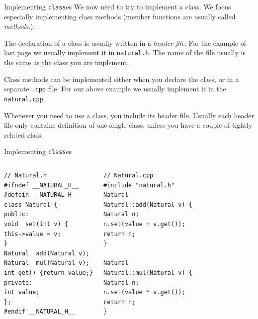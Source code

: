 \begin{frame}{Implementing \texttt{class}es}
We now need to try to implement a class. We focus especially implementing class methods (member functions are usually called \textit{methods}.). 

\vspace{0.1in}
The declaration of a class is usually written in a \textit{header file}. For the example of last page we usually implement it in \texttt{natural.h}. The name of the file usually is the same as the class you are implement.  

\vspace{0.1in}
Class methods can be implemented either when you declare the class, or in a separate \texttt{.cpp} file. For our above example we usually implement it in the \texttt{natural.cpp}.

\vspace{0.1in}
Whenever you need to use a class, you include its header file. Usually each header file only contains definition of one single class, unless you have a couple of tightly related class. 
\end{frame}

\begin{frame}[fragile]{Implementing \texttt{class}es}
\begin{columns}[]

\vspace{-.3in}
\begin{verbatim}
// Natural.h
#ifndef __NATURAL_H__
#defein __NATURAL_H__
class Natural {
public:
void  set(int v) {
this->value = v;
}
Natural  add(Natural v);
Natural  mul(Natural v);
int get() {return value;}
private:
int value;
};
#endif __NATURAL_H__
\end{verbatim}


\vspace{-.3in}

\begin{verbatim}
// Natural.cpp
#include "natural.h"
Natural 
Natural::add(Natural v) {
Natural n; 
n.set(value + v.get());
return n;
}

Natural 
Natural::mul(Natural v) {
Natural n; 
n.set(value * v.get());
return n;
}
\end{verbatim}
\end{columns}
\end{frame}



